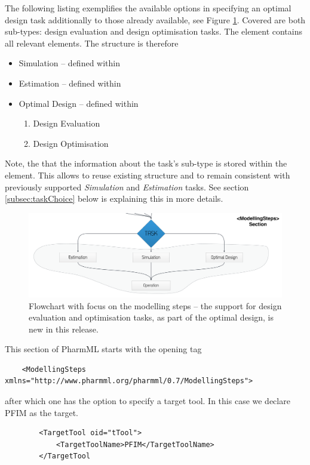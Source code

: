 The following listing exemplifies the available options in specifying an optimal 
design task additionally to those already available, see Figure \ref{fig:Flowchart_taskPart}. 
Covered are both sub-types: design evaluation and design optimisation tasks. 
The  element contains all relevant elements. 
The structure is therefore
\begin{itemize}
\item 
Simulation -- defined within 
\item 
Estimation -- defined within 
\item 
Optimal Design -- defined within 
\begin{enumerate}
\item 
Design Evaluation
\item
Design Optimisation
\end{enumerate}
\end{itemize}
Note, the that the information about the task's sub-type is stored within the 
 element. This allows to reuse existing structure and 
to remain consistent with previously supported \emph{Simulation} and 
\emph{Estimation} tasks. See section \ref{subsec:taskChoice} below is
explaining this in more details.
\begin{figure}[htb!]
\centering
 \includegraphics[width=140mm]{pics/Flowchart_stepsPart.pdf}
\caption{Flowchart with focus on the modelling steps -- the support for design 
evaluation and optimisation tasks, as part of the optimal design, is new in 
this release.}
\label{fig:Flowchart_taskPart}
\end{figure}
\newline
This section of PharmML starts with the opening tag
\lstset{language=XML}
\begin{lstlisting}
    <ModellingSteps xmlns="http://www.pharmml.org/pharmml/0.7/ModellingSteps">
\end{lstlisting}
after which one has the option to specify a target tool. In this case we declare 
PFIM as the target.
\lstset{language=XML}
\begin{lstlisting}
        <TargetTool oid="tTool">
            <TargetToolName>PFIM</TargetToolName>
        </TargetTool
\end{lstlisting}

